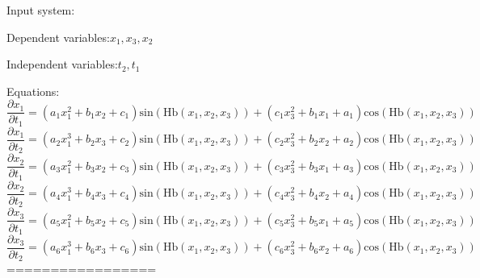 \documentclass[10pt,a4paper]{article}
\begin{document}
Input system:

Dependent variables:$x_{1}, x_{3}, x_{2}$

Independent variables:$t_{2}, t_{1}$

Equations:
\begin{dmath*}\frac{\partial x_{1}}{\partial t_{1}} = \left(a_{1}  x_{1} ^ {2} + b_{1}  x_{2} + c_{1}\right)  \text{sin}\left(\text{Hb}\left(x_{1}, x_{2}, x_{3}\right)\right) + \left(c_{1}  x_{3} ^ {2} + b_{1}  x_{1} + a_{1}\right)  \text{cos}\left(\text{Hb}\left(x_{1}, x_{2}, x_{3}\right)\right)\end{dmath*}
\begin{dmath*}\frac{\partial x_{1}}{\partial t_{2}} = \left(a_{2}  x_{1} ^ {3} + b_{2}  x_{3} + c_{2}\right)  \text{sin}\left(\text{Hb}\left(x_{1}, x_{2}, x_{3}\right)\right) + \left(c_{2}  x_{3} ^ {2} + b_{2}  x_{2} + a_{2}\right)  \text{cos}\left(\text{Hb}\left(x_{1}, x_{2}, x_{3}\right)\right)\end{dmath*}
\begin{dmath*}\frac{\partial x_{2}}{\partial t_{1}} = \left(a_{3}  x_{1} ^ {2} + b_{3}  x_{2} + c_{3}\right)  \text{sin}\left(\text{Hb}\left(x_{1}, x_{2}, x_{3}\right)\right) + \left(c_{3}  x_{3} ^ {2} + b_{3}  x_{1} + a_{3}\right)  \text{cos}\left(\text{Hb}\left(x_{1}, x_{2}, x_{3}\right)\right)\end{dmath*}
\begin{dmath*}\frac{\partial x_{2}}{\partial t_{2}} = \left(a_{4}  x_{1} ^ {3} + b_{4}  x_{3} + c_{4}\right)  \text{sin}\left(\text{Hb}\left(x_{1}, x_{2}, x_{3}\right)\right) + \left(c_{4}  x_{3} ^ {2} + b_{4}  x_{2} + a_{4}\right)  \text{cos}\left(\text{Hb}\left(x_{1}, x_{2}, x_{3}\right)\right)\end{dmath*}
\begin{dmath*}\frac{\partial x_{3}}{\partial t_{1}} = \left(a_{5}  x_{1} ^ {2} + b_{5}  x_{2} + c_{5}\right)  \text{sin}\left(\text{Hb}\left(x_{1}, x_{2}, x_{3}\right)\right) + \left(c_{5}  x_{3} ^ {2} + b_{5}  x_{1} + a_{5}\right)  \text{cos}\left(\text{Hb}\left(x_{1}, x_{2}, x_{3}\right)\right)\end{dmath*}
\begin{dmath*}\frac{\partial x_{3}}{\partial t_{2}} = \left(a_{6}  x_{1} ^ {3} + b_{6}  x_{3} + c_{6}\right)  \text{sin}\left(\text{Hb}\left(x_{1}, x_{2}, x_{3}\right)\right) + \left(c_{6}  x_{3} ^ {2} + b_{6}  x_{2} + a_{6}\right)  \text{cos}\left(\text{Hb}\left(x_{1}, x_{2}, x_{3}\right)\right)\end{dmath*}
=================
\end{document}
